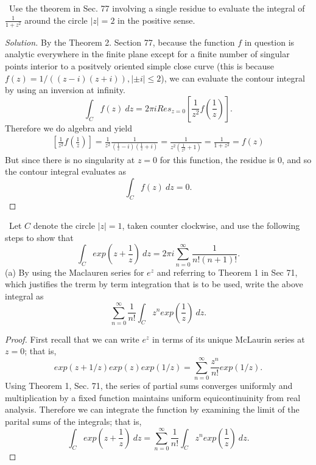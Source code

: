 \documentclass[11pt]{amsart}
\theoremstyle{definition}
\numberwithin{theorem}{section}
\numberwithin{definition}{section}
\numberwithin{equation}{section}
\newenvironment{solution}
  {\begin{proof}[Solution]}
  {\end{proof}}
\begin{document}
\medskip {}\ Use the theorem in Sec. 77 involving a single residue to evaluate the integral 
of $\frac{1}{1+z^2}$ around the circle $|z| = 2$ in the positive sense.
\begin{solution}
	By the Theorem 2. Section 77, because the function $f$ in question is analytic everywhere in the finite plane except for a finite number of singular points interior to a positvely oriented simple close curve (this is because $f(z) = 1/((z-i)(z+i)), |\pm i| \leq 2$), we can evaluate the contour integral by using an inversion at infinity.
	\begin{equation*}
		\int_C f(z)\ dz = 2\pi i Res_{z = 0} \left[\frac{1}{z^2} f\left(\frac{1}{z}\right)\right].
	\end{equation*}
	Therefore we do algebra and yield
	\begin{equation*}
		\begin{aligned}
			\left[\frac{1}{z^2} f\left(\frac{1}{z}\right)\right] = \frac{1}{z^2} \frac{1}{(\frac{1}{z} - i)(\frac{1}{z} + i)} = \frac{1}{z^2(\frac{1}{z^2} + 1)} = \frac{1}{1 + z^2} = f(z)
		\end{aligned}
	\end{equation*}
	But since there is no singularity at $z = 0$ for this function, the residue is $0$, and so the contour integral evaluates as 
	\begin{equation*}
		\int_C f(z)\ dz = 0.
	\end{equation*}
\end{solution}
\medskip {}\ Let $C$ denote the circle $|z| =1$, taken counter clockwise, and use the following steps to show that 
\begin{equation*}
	\int_C exp\left(z + \frac{1}{z}\right)\ dz = 2\pi i \sum_{n=0}^\infty \frac{1}{n!(n+1)!}.
\end{equation*}
(a) By using the Maclauren series for $e^z$ and referring to Theorem 1 in Sec 71, which justifies the trerm by term integration that is to be used, write the above integral as
\begin{equation*}
	\sum_{n=0}^\infty \frac{1}{n!} \int_C z^n exp\left(\frac{1}{z}\right)\ dz.
\end{equation*}
\begin{proof}
	First recall that we can write $e^z$ in terms of its unique McLaurin series at $z=0$; that is,
	\begin{equation*}
		exp(z + 1/z) exp(z)exp(1/z) = \sum_{n=0}^\infty \frac{z^n}{n!}exp(1/z).
	\end{equation*}
	Using Theorem 1, Sec. 71, the series of partial sums converges uniformly and multiplication by a fixed function maintains uniform equicontinuinity from real analysis. Therefore we can integrate the function by examining the limit of the parital sums of the integrals; that is,
	\begin{equation*}
		\int_C exp\left(z + \frac{1}{z}\right)\ dz = \sum_{n=0}^\infty \frac{1}{n!}\int_C z^n exp\left(\frac{1}{z}\right)\ dz.
	\end{equation*}
\end{proof}
\end{document}
